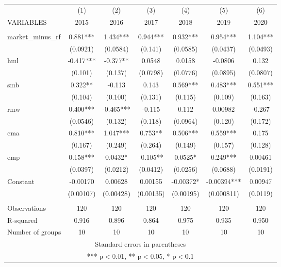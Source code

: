 \begin{tabular}{lcccccc} \hline
 & (1) & (2) & (3) & (4) & (5) & (6) \\
VARIABLES & 2015 & 2016 & 2017 & 2018 & 2019 & 2020 \\ \hline
 &  &  &  &  &  &  \\
market\_minus\_rf & 0.881*** & 1.434*** & 0.944*** & 0.932*** & 0.954*** & 1.104*** \\
 & (0.0921) & (0.0584) & (0.141) & (0.0585) & (0.0437) & (0.0493) \\
hml & -0.417*** & -0.377** & 0.0548 & 0.0158 & -0.0806 & 0.132 \\
 & (0.101) & (0.137) & (0.0798) & (0.0776) & (0.0895) & (0.0807) \\
smb & 0.322** & -0.113 & 0.143 & 0.569*** & 0.483*** & 0.551*** \\
 & (0.104) & (0.100) & (0.131) & (0.115) & (0.109) & (0.163) \\
rmw & 0.400*** & -0.465*** & -0.115 & 0.112 & 0.00982 & -0.267 \\
 & (0.0546) & (0.132) & (0.118) & (0.0964) & (0.120) & (0.172) \\
cma & 0.810*** & 1.047*** & 0.753** & 0.506*** & 0.559*** & 0.175 \\
 & (0.167) & (0.249) & (0.264) & (0.149) & (0.157) & (0.128) \\
emp & 0.158*** & 0.0432* & -0.105** & 0.0525* & 0.249*** & 0.00461 \\
 & (0.0397) & (0.0212) & (0.0412) & (0.0256) & (0.0688) & (0.0191) \\
Constant & -0.00170 & 0.00628 & 0.00155 & -0.00372* & -0.00394*** & 0.00947 \\
 & (0.00107) & (0.00428) & (0.00135) & (0.00195) & (0.000811) & (0.0119) \\
 &  &  &  &  &  &  \\
Observations & 120 & 120 & 120 & 120 & 120 & 120 \\
R-squared & 0.916 & 0.896 & 0.864 & 0.975 & 0.935 & 0.950 \\
 Number of groups & 10 & 10 & 10 & 10 & 10 & 10 \\ \hline
\multicolumn{7}{c}{ Standard errors in parentheses} \\
\multicolumn{7}{c}{ *** p$<$0.01, ** p$<$0.05, * p$<$0.1} \\
\end{tabular}
